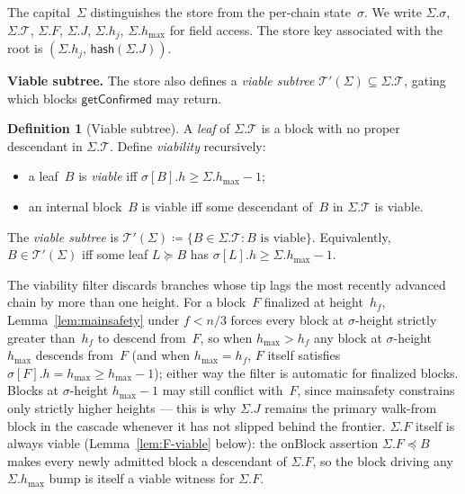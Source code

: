 \documentclass{article}
\newcommand{\T}[0]{\ensuremath{\mathcal{T}}}
\newcommand{\hash}{\mathsf{hash}}
\newcommand{\hmax}{\ensuremath{h_{\max}}\xspace}
\newcommand{\viableTree}{\ensuremath{\mathcal{T}'}}
\newcommand{\onBlock}{\textsf{onBlock}\xspace}
\newcommand{\getConfirmed}{\textsf{getConfirmed}\xspace}
\renewcommand{\paragraph}[1]{\vspace{7pt}\noindent\textbf{#1}}
\theoremstyle{plain}
\theoremstyle{definition}
\newtheorem{definition}{Definition}
\theoremstyle{remark}
\begin{document}
The capital~$\Sigma$ distinguishes the store from the per-chain state~$\sigma$.
We write $\Sigma.\sigma$, $\Sigma.\T$, $\Sigma.F$, $\Sigma.J$, $\Sigma.h_j$, $\Sigma.\hmax$ for field access.
The store key associated with the root is $(\Sigma.h_j,\, \hash(\Sigma.J))$.

\paragraph{Viable subtree.}
The store also defines a \emph{viable subtree} $\viableTree(\Sigma) \subseteq \Sigma.\T$, gating which blocks $\getConfirmed$ may return.

\begin{definition}[Viable subtree]\label{def:viable}
A \emph{leaf} of $\Sigma.\T$ is a block with no proper descendant in $\Sigma.\T$.
Define \emph{viability} recursively:
\begin{itemize}
  \item a leaf~$B$ is \emph{viable} iff $\sigma[B].h \geq \Sigma.\hmax - 1$;
  \item an internal block~$B$ is viable iff some descendant of~$B$ in $\Sigma.\T$ is viable.
\end{itemize}
The \emph{viable subtree} is $\viableTree(\Sigma) \coloneqq \{B \in \Sigma.\T : B \text{ is viable}\}$.
Equivalently, $B \in \viableTree(\Sigma)$ iff some leaf $L \succeq B$ has $\sigma[L].h \geq \Sigma.\hmax - 1$.
\end{definition}

The viability filter discards branches whose tip lags the most recently advanced chain by more than one height.
For a block~$F$ finalized at height~$h_f$, Lemma~\ref{lem:mainsafety} under $f < n/3$ forces every block at $\sigma$-height strictly greater than~$h_f$ to descend from~$F$, so when $\hmax > h_f$ any block at $\sigma$-height~$\hmax$ descends from~$F$ (and when $\hmax = h_f$, $F$ itself satisfies $\sigma[F].h = \hmax \geq \hmax - 1$); either way the filter is automatic for finalized blocks.
Blocks at $\sigma$-height $\hmax - 1$ may still conflict with~$F$, since mainsafety constrains only strictly higher heights --- this is why $\Sigma.J$ remains the primary walk-from block in the cascade whenever it has not slipped behind the frontier.
$\Sigma.F$ itself is always viable (Lemma~\ref{lem:F-viable} below): the \onBlock assertion $\Sigma.F \preceq B$ makes every newly admitted block a descendant of $\Sigma.F$, so the block driving any $\Sigma.\hmax$ bump is itself a viable witness for $\Sigma.F$.
\end{document}
